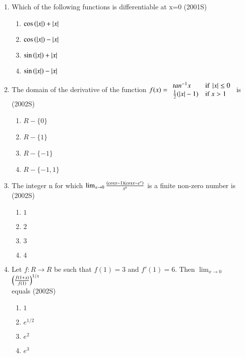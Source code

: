 \documentclass[journal,12pt,twocolumn]{IEEEtran}
\theoremstyle{remark}
\begin{document}
\begin{enumerate}
\item %

    Which of the following functions is differentiable at x=0 \hfill{(2001S)}
    \begin{enumerate}
	    \item $\cos\left(\left\vert x\right\vert\right)+\left\vert x\right\vert$
	    \item $\cos\left(\left\vert x\right\vert\right)-\left\vert x\right\vert$
	    \item $\sin\left(\left\vert x\right\vert\right)+\left\vert x\right\vert$
	    \item $\sin\left(\left\vert x\right\vert\right)-\left\vert x\right\vert$\\
    \end{enumerate}


\item %

    The domain of the derivative of the function $f(x)= 
\begin{array}{ll}
tan^{-1}x
	& \text{if } \left\vert x\right\vert \leq 0 \\
	\frac{1}{2}(\left\vert x\right\vert-1) & \text{if } x > 1
\end{array}$ is \hfill{(2002S)}
    \begin{enumerate}
     \item $R-\{0\}$
     \item $R-\{1\}$
     \item $R-\{-1\}$
     \item $R-\{-1,1\}$\\
    \end{enumerate}


\item %

	The integer n for which $\lim_{x \to 0}\frac{\left(cosx-1\right)\left(cosx-e^{x}\right)}{x^{n}}$ is a finite non-zero number is \hfill{(2002S)}
    \begin{enumerate}
     \item $1$
     \item $2$
     \item $3$
     \item $4$\\
    \end{enumerate}

\item %

	Let $f:R \rightarrow R$ be such that $f(1)=3$ and $f'(1)=6$. Then $\lim_{x \to 0}$ $ \left( \frac{f(1+x)}{f(1)}\right)^{1/x}$\ \\ equals \hfill{(2002S)}
    \begin{enumerate}
     \item $1$
     \item $e^{1/2}$
     \item $e^2$
     \item $e^3$\\
    \end{enumerate}



\end{enumerate}
\end{document}
